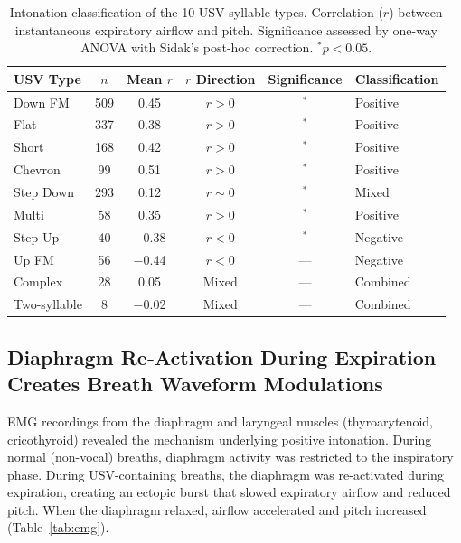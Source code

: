 \documentclass[11pt]{article}
\begin{document}
\begin{table}[H]
\centering
\caption{Intonation classification of the 10 USV syllable types. Correlation ($r$) between instantaneous expiratory airflow and pitch. Significance assessed by one-way ANOVA with Sidak's post-hoc correction. $^{*}p < 0.05$.}
\label{tab:intonation}
\begin{tabular}{lccccl}
\toprule
\textbf{USV Type} & \textbf{$n$} & \textbf{Mean $r$} & \textbf{$r$ Direction} & \textbf{Significance} & \textbf{Classification} \\
\midrule
Down FM & 509 & 0.45 & $r > 0$ & $^{*}$ & Positive \\
Flat & 337 & 0.38 & $r > 0$ & $^{*}$ & Positive \\
Short & 168 & 0.42 & $r > 0$ & $^{*}$ & Positive \\
Chevron & 99 & 0.51 & $r > 0$ & $^{*}$ & Positive \\
Step Down & 293 & 0.12 & $r \sim 0$ & $^{*}$ & Mixed \\
Multi & 58 & 0.35 & $r > 0$ & $^{*}$ & Positive \\
Step Up & 40 & $-$0.38 & $r < 0$ & $^{*}$ & Negative \\
Up FM & 56 & $-$0.44 & $r < 0$ & --- & Negative \\
Complex & 28 & 0.05 & Mixed & --- & Combined \\
Two-syllable & 8 & $-$0.02 & Mixed & --- & Combined \\
\bottomrule
\end{tabular}
\end{table}

\subsection{Diaphragm Re-Activation During Expiration Creates Breath Waveform Modulations}

EMG recordings from the diaphragm and laryngeal muscles (thyroarytenoid, cricothyroid) revealed the mechanism underlying positive intonation. During normal (non-vocal) breaths, diaphragm activity was restricted to the inspiratory phase. During USV-containing breaths, the diaphragm was re-activated during expiration, creating an ectopic burst that slowed expiratory airflow and reduced pitch. When the diaphragm relaxed, airflow accelerated and pitch increased (Table~\ref{tab:emg}).
\end{document}
